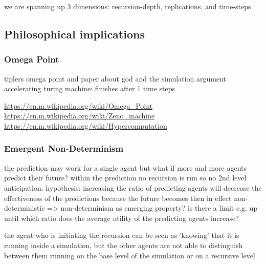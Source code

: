we are spanning up 3 dimensions: recursion-depth, replications, and time-steps

\subsection{Philosophical implications}

\subsubsection{Omega Point}
tiplers omega point and paper about god and the simulation argument
accelerating turing machine: finishes after 1 time steps

\url{https://en.m.wikipedia.org/wiki/Omega_Point}
\url{https://en.m.wikipedia.org/wiki/Zeno_machine}
\url{https://en.m.wikipedia.org/wiki/Hypercomputation}

\subsubsection{Emergent Non-Determinism}
the prediction may work for a single agent but what if more and more agents predict their future? within the prediction no recursion is run so no 2nd level anticipation. 
hypothesis: increasing the ratio of predicting agents will decrease the effectiveness of the predictions because the future becomes then in effect non-deterministic => non-determinism as emerging property? is there a limit e.g. up until which ratio does the average utility of the predicting agents increase?

the agent who is initiating the recursion can be seen as 'knowing' that it is running inside a simulation, but the other agents are not able to distinguish between them running on the base level of the simulation or on a recursive level

